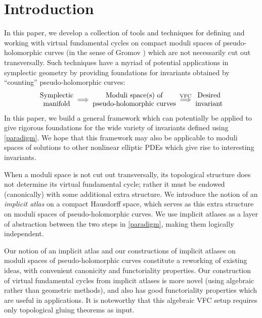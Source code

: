 \documentclass[12pt]{article}
\theoremstyle{definition}
\theoremstyle{remark}
\numberwithin{equation}{subsection}
\begin{document}
\setcounter{tocdepth}{2}
\tableofcontents

\section{Introduction}\label{introsec}

In this paper, we develop a collection of tools and techniques for defining and working with virtual fundamental cycles on compact moduli spaces of pseudo-holomorphic curves (in the sense of Gromov \cite{gromov}) which are not necessarily cut out transversally.  Such techniques have a myriad of potential applications in symplectic geometry by providing foundations for invariants obtained by ``counting'' pseudo-holomorphic curves:
\begin{equation}\label{paradigm}
\begin{matrix}\text{Symplectic}\cr\text{manifold}\end{matrix}\;\Longrightarrow\;\begin{matrix}\text{Moduli space(s) of}\cr\text{pseudo-holomorphic curves}\end{matrix}\;\overset{\text{VFC}}\Longrightarrow\;\begin{matrix}\text{Desired}\cr\text{invariant}\end{matrix}
\end{equation}
In this paper, we build a general framework which can potentially be applied to give rigorous foundations for the wide variety of invariants defined using \eqref{paradigm}.  We hope that this framework may also be applicable to moduli spaces of solutions to other nonlinear elliptic PDEs which give rise to interesting invariants.

When a moduli space is not cut out transversally, its topological structure does not determine its virtual fundamental cycle; rather it must be endowed (canonically) with some additional extra structure.  We introduce the notion of an \emph{implicit atlas} on a compact Hausdorff space, which serves as this extra structure on moduli spaces of pseudo-holomorphic curves.  We use implicit atlases as a layer of abstraction between the two steps in \eqref{paradigm}, making them logically independent.

Our notion of an implicit atlas and our constructions of implicit atlases on moduli spaces of pseudo-holomorphic curves constitute a reworking of existing ideas, with convenient canonicity and functoriality properties.  Our construction of virtual fundamental cycles from implicit atlases is more novel (using algebraic rather than geometric methods), and also has good functoriality properties which are useful in applications.  It is noteworthy that this algebraic VFC setup requires only topological gluing theorems as input.
\end{document}
